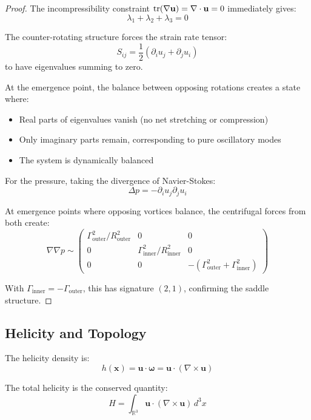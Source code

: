 \begin{proof}
The incompressibility constraint $\tr(\nabla \mathbf{u}) = \nabla \cdot \mathbf{u} = 0$ immediately gives:
\begin{equation}
\lambda_1 + \lambda_2 + \lambda_3 = 0
\end{equation}

The counter-rotating structure forces the strain rate tensor:
\begin{equation}
S_{ij} = \frac{1}{2}(\partial_i u_j + \partial_j u_i)
\end{equation}
to have eigenvalues summing to zero.

At the emergence point, the balance between opposing rotations creates a state where:
\begin{itemize}
\item Real parts of eigenvalues vanish (no net stretching or compression)
\item Only imaginary parts remain, corresponding to pure oscillatory modes
\item The system is dynamically balanced
\end{itemize}

For the pressure, taking the divergence of Navier-Stokes:
\begin{equation}
\Delta p = -\partial_i u_j \partial_j u_i
\end{equation}

At emergence points where opposing vortices balance, the centrifugal forces from both create:
\begin{equation}
\nabla \nabla p \sim \begin{pmatrix}
\Gamma_{\text{outer}}^2/R_{\text{outer}}^2 & 0 & 0 \\
0 & \Gamma_{\text{inner}}^2/R_{\text{inner}}^2 & 0 \\
0 & 0 & -(\Gamma_{\text{outer}}^2 + \Gamma_{\text{inner}}^2)
\end{pmatrix}
\end{equation}

With $\Gamma_{\text{inner}} = -\Gamma_{\text{outer}}$, this has signature $(2,1)$, confirming the saddle structure.
\end{proof}

\subsection{Helicity and Topology}

\begin{defn}[Helicity]\label{def:helicity}
The helicity density is:
\begin{equation}
h(\mathbf{x}) = \mathbf{u} \cdot \boldsymbol{\omega} = \mathbf{u} \cdot (\nabla \times \mathbf{u})
\end{equation}

The total helicity is the conserved quantity\cite{moffatt1985}:
\begin{equation}
H = \int_{\mathbb{R}^3} \mathbf{u} \cdot (\nabla \times \mathbf{u}) \, d^3x
\end{equation}
\end{defn}

